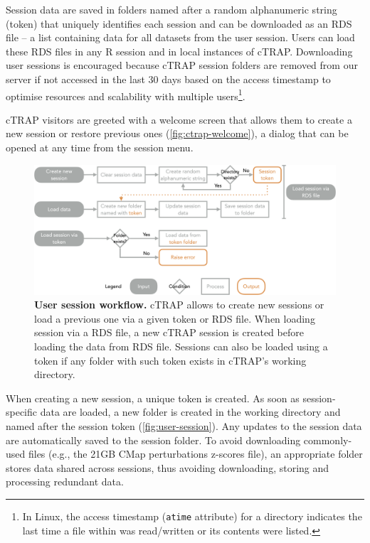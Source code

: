 Session data are saved in folders named after a random alphanumeric string (token) that uniquely identifies each session and can be downloaded as an RDS file -- a list containing data for all datasets from the user session. Users can load these RDS files in any R session and in local instances of cTRAP. Downloading user sessions is encouraged because cTRAP session folders are removed from our server if not accessed in the last 30 days based on the access timestamp to optimise resources and scalability with multiple users\footnote{In Linux, the access timestamp (\texttt{atime} attribute) for a directory indicates the last time a file within was read/written or its contents were listed.}.

cTRAP visitors are greeted with a welcome screen that allows them to create a new session or restore previous ones (\autoref{fig:ctrap-welcome}), a dialog that can be opened at any time from the session menu.

\begin{figure}[!t]
  \includegraphics[width=\textwidth]{images/ctrap/user-session}
  \centering
  \caption[User session workflow]{\textbf{User session workflow.} cTRAP allows to create new sessions or load a previous one via a given token or RDS file. When loading session via a RDS file, a new cTRAP session is created before loading the data from RDS file. Sessions can also be loaded using a token if any folder with such token exists in cTRAP's working directory.}
  \label{fig:user-session}
\end{figure}

When creating a new session, a unique token is created. As soon as session-specific data are loaded, a new folder is created in the working directory and named after the session token (\autoref{fig:user-session}). Any updates to the session data are automatically saved to the session folder. To avoid downloading commonly-used files (e.g., the 21GB CMap perturbations z-scores file), an appropriate folder stores data shared across sessions, thus avoiding downloading, storing and processing redundant data.

